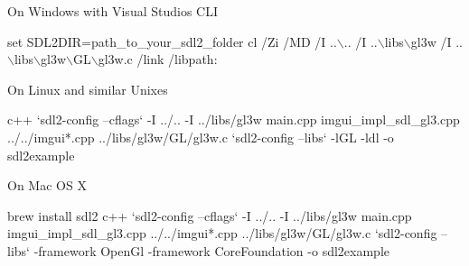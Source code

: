 
\begin{DoxyItemize}
\item On Windows with Visual Studio\textquotesingle{}s C\+LI
\end{DoxyItemize}


\begin{DoxyCode}
set SDL2DIR=path\_to\_your\_sdl2\_folder
cl /Zi /MD /I ..\(\backslash\).. /I ..\(\backslash\)libs\(\backslash\)gl3w /I %
       ..\(\backslash\)libs\(\backslash\)gl3w\(\backslash\)GL\(\backslash\)gl3w.c /link /libpath:%
\end{DoxyCode}



\begin{DoxyItemize}
\item On Linux and similar Unixes
\end{DoxyItemize}


\begin{DoxyCode}
c++ `sdl2-config --cflags` -I ../.. -I ../libs/gl3w main.cpp imgui\_impl\_sdl\_gl3.cpp ../../imgui*.cpp
       ../libs/gl3w/GL/gl3w.c `sdl2-config --libs` -lGL -ldl -o sdl2example
\end{DoxyCode}



\begin{DoxyItemize}
\item On Mac OS X
\end{DoxyItemize}


\begin{DoxyCode}
brew install sdl2
c++ `sdl2-config --cflags` -I ../.. -I ../libs/gl3w main.cpp imgui\_impl\_sdl\_gl3.cpp ../../imgui*.cpp
       ../libs/gl3w/GL/gl3w.c `sdl2-config --libs` -framework OpenGl -framework CoreFoundation -o sdl2example
\end{DoxyCode}
 